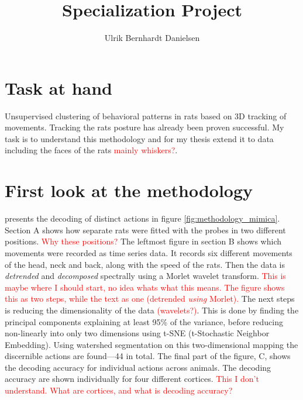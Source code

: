\documentclass{article}
\title{Specialization Project}
\author{Ulrik Bernhardt Danielsen}
\theoremstyle{plain}
\theoremstyle{definition}
\theoremstyle{remark}
\begin{document}
\maketitle


\section{Task at hand}
Unsupervised clustering of behavioral patterns in rats based on 3D tracking of movements.
Tracking the rats posture has already been proven successful.
My task is to understand this methodology and for my thesis extend it to data including the faces of the rats \textcolor{red}{mainly whiskers?}.


\section{First look at the methodology}
\cite{Mimica} presents the decoding of distinct actions in figure \ref{fig:methodology_mimica}.
Section A shows how separate rats were fitted with the probes in two different positions.
\textcolor{red}{Why these positions?} The leftmost figure in section B shows which movements were recorded as time series data.
It records six different movements of the head, neck and back, along with the speed of the rats.
Then the data is \textit{detrended} and \textit{decomposed} spectrally using a Morlet wavelet transform. 
\textcolor{red}{This is maybe where I should start, no idea whats what this means.
The figure shows this as two steps, while the text as one (detrended \textit{using} Morlet).}
The next steps is reducing the dimensionality of the data \textcolor{red}{(wavelets?)}.  
This is done by finding the principal components explaining at least 95\% of the variance, before reducing non-linearly into only two dimensions using t-SNE (t-Stochastic Neighbor Embedding).
Using watershed segmentation on this two-dimensional mapping the discernible actions are found—44 in total.
The final part of the figure, C, shows the decoding accuracy for individual actions across animals.
The decoding accuracy are shown individually for four different cortices. 
\textcolor{red}{This I don't understand.
What are cortices, and what is decoding accuracy?}
\end{document}
